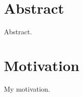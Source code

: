 \section{Abstract}
\label{sec:abstract}
Abstract. \\

\lipsum[1-2]

\section{Motivation}
\label{sec:motivation}
My motivation. \\

\lipsum[3]